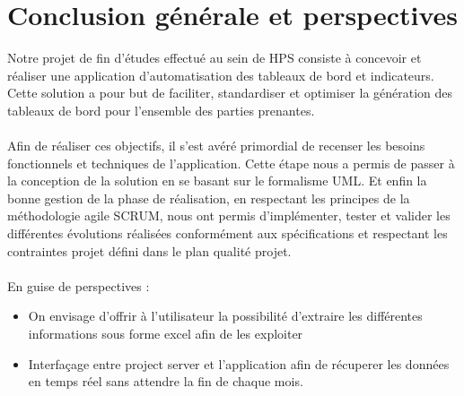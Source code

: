 \chapter*{Conclusion générale et perspectives}
Notre projet de fin d’études effectué au sein de HPS consiste à concevoir et réaliser une application d’automatisation des tableaux de bord et indicateurs. Cette solution a pour but de faciliter, standardiser et optimiser la génération des tableaux de bord pour l’ensemble des parties prenantes.\\ \\
Afin de réaliser ces objectifs, il s’est avéré primordial de recenser les besoins fonctionnels et techniques de l’application. Cette étape nous a permis de passer à la conception de la solution en se basant sur le formalisme UML. Et enfin la bonne gestion de la phase de réalisation, en respectant les principes de la méthodologie agile SCRUM, nous ont permis d’implémenter, tester et valider les différentes évolutions réalisées conformément aux spécifications et respectant les contraintes projet défini dans le plan qualité projet.\\ \\
En guise de perspectives : 
\begin{itemize}[label=\textbullet]
\item On envisage d'offrir à l'utilisateur la possibilité d'extraire les différentes informations sous forme excel afin de les exploiter
\item Interfaçage entre project server et l'application afin de récuperer les données en temps réel sans attendre la fin de chaque mois.
\end{itemize}